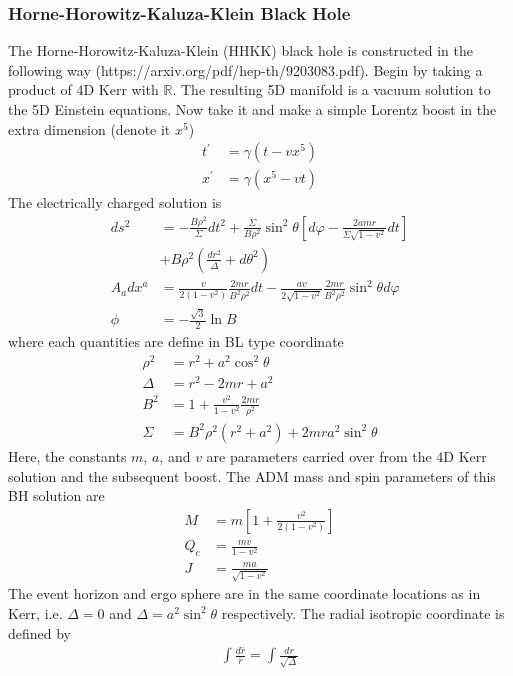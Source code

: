\documentclass[%
 reprint,
 amsmath,amssymb,
 aps,
]{revtex4-1}
\begin{document}
\subsubsection{Horne-Horowitz-Kaluza-Klein Black Hole}
The Horne-Horowitz-Kaluza-Klein (HHKK) black hole is constructed in the following way (https://arxiv.org/pdf/hep-th/9203083.pdf). Begin by taking a product of 4D Kerr with $\mathbb{R}$. The resulting 5D manifold is a vacuum solution to the 5D Einstein equations. Now take it and make a simple Lorentz boost in the extra dimension (denote it $x^5$)
\begin{align}
t^\prime &= \gamma (t - v x^5) \\
x^\prime &= \gamma (x^5 - v t)
\end{align}
The electrically charged solution is
\begin{align}
ds^2 &= -\frac{B \rho^2}{\Sigma} dt^2 + \frac{\Sigma}{B \rho^2} \sin^2 \theta \left[d \varphi - \frac{2 a m r}{\Sigma \sqrt{1-v^2}} dt \right] \nonumber \\
&+ B \rho^2 \left(\frac{d r^2}{\Delta} + d \theta^2 \right) \\
A_a dx^a &= \frac{v}{2(1-v^2)} \frac{2 m r}{B^2 \rho^2} dt - \frac{a v}{2 \sqrt{1-v^2}} \frac{2mr}{B^2 \rho^2} \sin^2 \theta d \varphi \\
\phi &= -\frac{\sqrt{3}}{2} \ln B
\end{align}
where each quantities are define in BL type coordinate
\begin{align}
\rho^2 &= r^2 + a^2 \cos^2 \theta \\
\Delta &= r^2 -2mr + a^2 \\
B^2 &= 1+ \frac{v^2}{1-v^2} \frac{2mr}{\rho^2}\\
\Sigma &= B^2 \rho^2 (r^2 + a^2) + 2 m r a^2 \sin^2 \theta
\end{align}
Here, the constants $m$, $a$, and $v$ are parameters carried over from the 4D Kerr solution and the subsequent boost. The ADM mass and spin parameters of this BH solution are
\begin{align}
M &= m \left[ 1+\frac{v^2}{2(1-v^2)} \right] \\
Q_e &= \frac{mv}{1-v^2} \\
J &= \frac{ma}{\sqrt{1-v^2}}
\end{align}
The event horizon and ergo sphere are in the same coordinate locations as in Kerr, i.e. $\Delta = 0$ and $\Delta = a^2 \sin^2 \theta$ respectively. The radial isotropic coordinate is defined by
\begin{align}
\int \frac{d \bar{r}}{\bar{r}} = \int \frac{dr}{\sqrt{\Delta}}
\end{align}
\end{document}
